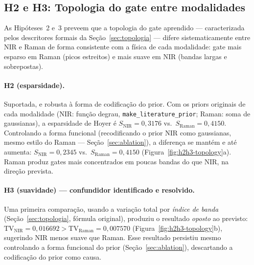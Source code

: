 %
%

\subsection{H2 e H3: Topologia do gate entre modalidades}
\label{sec:results-h2h3}

As Hipóteses~2 e~3 preveem que a topologia do gate aprendido --- caracterizada pelos descritores formais da Seção~\ref{sec:topologia} --- difere sistematicamente entre NIR e Raman de forma consistente com a física de cada modalidade: gate mais esparso em Raman (picos estreitos) e mais suave em NIR (bandas largas e sobrepostas).

\paragraph{H2 (esparsidade).} Suportada, e robusta à forma de codificação do prior. Com os priors originais de cada modalidade (NIR: função degrau, \texttt{make\_literature\_prior}; Raman: soma de gaussianas), a esparsidade de Hoyer é $S_{\text{NIR}}=0{,}3176$ vs.\ $S_{\text{Raman}}=0{,}4150$. Controlando a forma funcional (recodificando o prior NIR como gaussianas, mesmo estilo do Raman --- Seção~\ref{sec:ablation}), a diferença se mantém e até aumenta: $S_{\text{NIR}}=0{,}2345$ vs.\ $S_{\text{Raman}}=0{,}4150$ (Figura~\ref{fig:h2h3-topology}a). Raman produz gates mais concentrados em poucas bandas do que NIR, na direção prevista.

\paragraph{H3 (suavidade) --- confundidor identificado e resolvido.} Uma primeira comparação, usando a variação total por \emph{índice de banda} (Seção~\ref{sec:topologia}, fórmula original), produziu o resultado \emph{oposto} ao previsto: $\mathrm{TV}_{\text{NIR}}=0{,}016692 > \mathrm{TV}_{\text{Raman}}=0{,}007570$ (Figura~\ref{fig:h2h3-topology}b), sugerindo NIR menos suave que Raman. Esse resultado persistiu mesmo controlando a forma funcional do prior (Seção~\ref{sec:ablation}), descartando a codificação do prior como causa.

